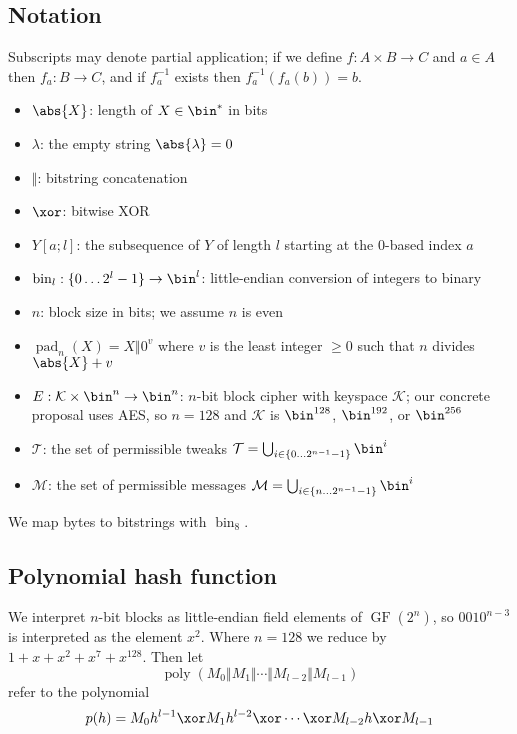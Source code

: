 \documentclass[letterpaper,11pt]{article}
\newcommand*{\Concat}{\Vert}
\DeclareMathOperator{\fromint}{bin}
\DeclareMathOperator{\GF}{GF}
\DeclareMathOperator{\pad}{pad}
\DeclareMathOperator{\poly}{poly}
\begin{document}
\subsection{Notation}
Subscripts may denote partial application; if we define $f: A \times B \rightarrow C$ and
$a \in A$ then $f_a: B \rightarrow C$, and if $f_a^{-1}$ exists then $f_a^{-1}(f_a(b)) = b$.
\begin{itemize}
    \item $\abs{X}$: length of $X \in \bin^{*}$ in bits
    \item $\lambda$: the empty string $\abs{\lambda} = 0$
    \item $\Concat$: bitstring concatenation
    \item \(\xor\): bitwise XOR
    \item $Y[a;l]$: the subsequence of $Y$ of length $l$ starting at the 0-based index $a$
    \item $\fromint_l: \{0 \ldots 2^l-1\} \rightarrow \bin^l$:
    little-endian conversion of integers to binary
    \item \(n\): block size in bits; we assume \(n\) is even
    \item $\pad_n(X) = X \Concat 0^v$
    where $v$ is the least integer $\geq 0$ such that $n$ divides $\abs{X} + v$
    \item \(E: \mathcal{K} \times \bin^n \rightarrow \bin^n\): 
    \(n\)-bit block cipher with keyspace \(\mathcal{K}\);
    our concrete proposal uses AES, so \(n=128\) and \(\mathcal{K}\) is
    \(\bin^{128}\), \(\bin^{192}\), or \(\bin^{256}\)
    \item \(\mathcal{T}\): the set of permissible tweaks
    \(\mathcal{T} = \bigcup_{i \in \{0\ldots2^{n-1}-1\}}\bin^i\)
    \item \(\mathcal{M}\): the set of permissible messages
    \(\mathcal{M} = \bigcup_{i \in \{n\ldots2^{n-1}-1\}}\bin^i\)
\end{itemize}
We map bytes to bitstrings with \(\fromint_8\).

\subsection{Polynomial hash function}
We interpret \(n\)-bit blocks as little-endian field elements of \(\GF(2^n)\),
so \(0010^{n-3}\) is interpreted as the element \(x^2\).
Where \(n=128\) we reduce by
\(1 + x + x^2 + x^7 + x^{128}\). Then let
\begin{displaymath}
    \poly(M_0 \Concat M_1 \Concat \cdots \Concat M_{l-2} \Concat M_{l-1})
\end{displaymath}
refer to the polynomial
\begin{displaymath}
    p(h) = M_0h^{l-1} \xor M_1h^{l-2} \xor \cdots \xor M_{l-2}h \xor M_{l-1}
\end{displaymath}
\end{document}
